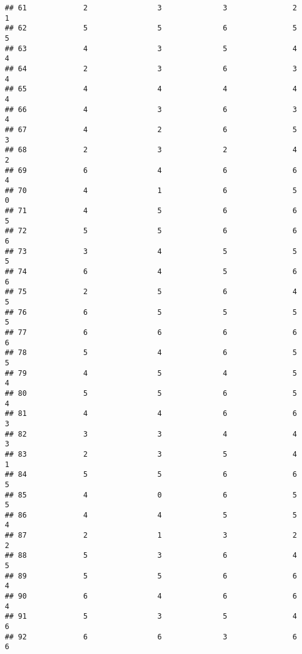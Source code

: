 \documentclass[
]{article}
\begin{document}
\begin{verbatim}
## 61             2                3              3               2              1
## 62             5                5              6               5              5
## 63             4                3              5               4              4
## 64             2                3              6               3              4
## 65             4                4              4               4              4
## 66             4                3              6               3              4
## 67             4                2              6               5              3
## 68             2                3              2               4              2
## 69             6                4              6               6              4
## 70             4                1              6               5              0
## 71             4                5              6               6              5
## 72             5                5              6               6              6
## 73             3                4              5               5              5
## 74             6                4              5               6              6
## 75             2                5              6               4              5
## 76             6                5              5               5              5
## 77             6                6              6               6              6
## 78             5                4              6               5              5
## 79             4                5              4               5              4
## 80             5                5              6               5              4
## 81             4                4              6               6              3
## 82             3                3              4               4              3
## 83             2                3              5               4              1
## 84             5                5              6               6              5
## 85             4                0              6               5              5
## 86             4                4              5               5              4
## 87             2                1              3               2              2
## 88             5                3              6               4              5
## 89             5                5              6               6              4
## 90             6                4              6               6              4
## 91             5                3              5               4              6
## 92             6                6              3               6              6

\end{verbatim}
\end{document}

